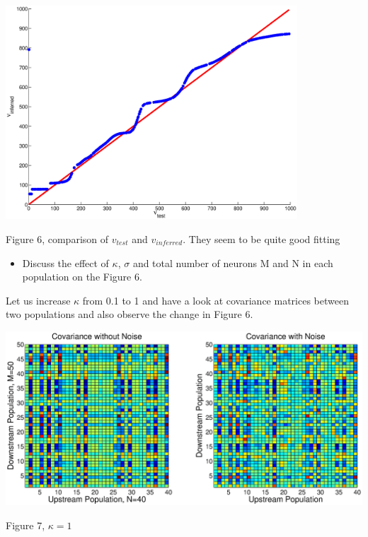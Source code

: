 \documentclass{article}
\begin{document}
\begin{center}
\includegraphics[width=\textwidth, height=80mm]{f4.eps}
\begin{footnotesize}
 Figure 6, comparison of $v_{test}$ and $v_{inferred}$. They seem to be quite good fitting
\end{footnotesize}
\end{center}

\begin{itemize}
 \item Discuss the effect of $\kappa$, $\sigma$ and total number of neurons M and N in each population on the Figure 6.
\end{itemize}

Let us increase $\kappa$ from 0.1 to 1 and have a look at covariance matrices between two populations and also observe the change in Figure 6. 

\begin{center}
\includegraphics[width=\textwidth]{kappa2.eps}
\begin{footnotesize}
 Figure 7, $\kappa=1$
\end{footnotesize}
\end{center}
\end{document}
